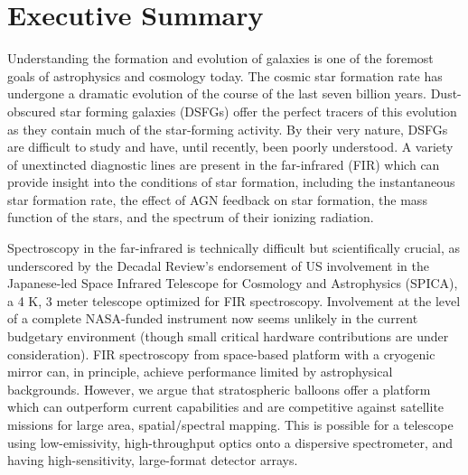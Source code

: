 \section{Executive Summary}

\parskip0pt Understanding the formation and evolution of galaxies is
one of the foremost goals of astrophysics and cosmology
today.
The cosmic star formation rate has undergone a dramatic evolution of the course of the last seven billion years.  Dust-obscured star forming galaxies (DSFGs) offer the perfect tracers of this evolution as they contain much of the star-forming activity.
By their very nature, DSFGs are difficult to study and have, until recently, been poorly understood.
A variety of unextincted diagnostic lines are present in the far-infrared
(FIR) which can provide insight into the conditions of star
formation, including the instantaneous star formation rate, the effect of AGN feedback on star formation, the mass function of the stars, and the spectrum of their ionizing radiation.

Spectroscopy in the far-infrared is technically difficult but scientifically crucial, as underscored by the Decadal Review's endorsement of US involvement in the Japanese-led Space Infrared Telescope for Cosmology and Astrophysics (SPICA), a 4 K, 3 meter telescope optimized for FIR spectroscopy.  Involvement at the level of a complete NASA-funded instrument now seems unlikely in the current budgetary environment (though small critical hardware contributions are under consideration).  FIR spectroscopy from space-based platform with a cryogenic mirror can, in principle, achieve performance limited by astrophysical backgrounds.  However, we argue that stratospheric balloons offer a platform which can outperform current capabilities and are competitive against satellite missions for large area, spatial/spectral mapping. 
This is possible for a telescope using low-emissivity, high-throughput optics onto a dispersive spectrometer, and having high-sensitivity, large-format detector arrays.


